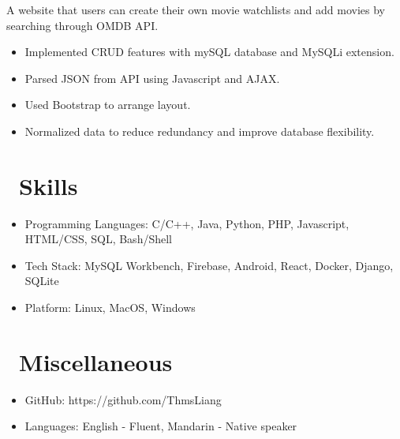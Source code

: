 \documentclass{resume}
\begin{document}
A website that users can create their own movie watchlists and add movies by searching through OMDB API.
\begin{itemize}
  \item Implemented CRUD features with mySQL database and MySQLi extension.
  \item Parsed JSON from API using Javascript and AJAX.
  \item Used Bootstrap to arrange layout.
  \item Normalized data to reduce redundancy and improve database flexibility.
\end{itemize}



\section{\faCogs\ Skills}
\begin{itemize}[parsep=0.5ex]
  \item Programming Languages: C/C++, Java, Python, PHP, Javascript, HTML/CSS, SQL, Bash/Shell
  \item Tech Stack: MySQL Workbench, Firebase, Android, React, Docker, Django, SQLite
  \item Platform: Linux, MacOS, Windows
\end{itemize}

\section{\faInfo\ Miscellaneous}
\begin{itemize}[parsep=0.5ex]
  \item GitHub: https://github.com/ThmsLiang
  \item Languages: English - Fluent, Mandarin - Native speaker
\end{itemize}

%
%
\end{document}
